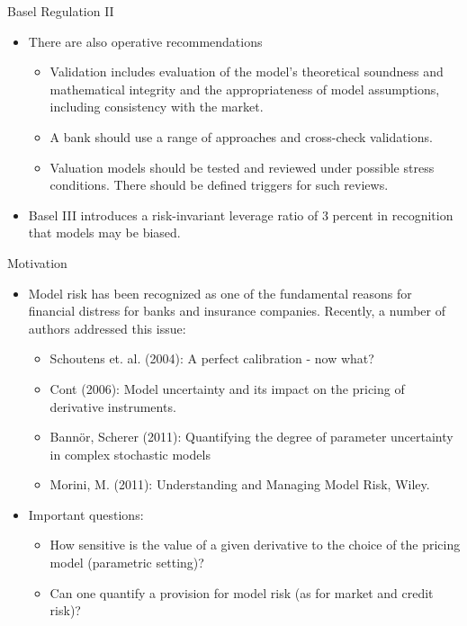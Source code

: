 {Basel Regulation II}
\begin{itemize}

\item<1-> There are also operative recommendations
\begin{itemize}
\item Validation includes evaluation of the model's theoretical soundness and mathematical integrity and the appropriateness of model assumptions, including consistency with the market.
\item A bank should use a range of approaches and cross-check validations.
\item Valuation models should be tested and reviewed under possible stress conditions. There should be defined triggers for such reviews.
\end{itemize}

\item<2->
Basel III introduces a risk-invariant leverage ratio of 3 percent in recognition that models may be biased.


\end{itemize}



{Motivation}
\begin{itemize}
\item<1-> Model risk has been recognized as one of the fundamental reasons for financial distress for banks and insurance companies.
Recently, a number of authors addressed this issue:
\begin{itemize}
\item Schoutens et. al. (2004): A perfect calibration - now what?
\item Cont (2006): Model uncertainty and its impact on the pricing of derivative instruments.
\item Bann{\"o}r, Scherer (2011): Quantifying the degree of parameter uncertainty in complex stochastic models
\item Morini, M. (2011): Understanding and Managing Model Risk, Wiley.
\end{itemize}
\item<2-> Important questions:
\begin{itemize}
\item How sensitive is the value of a given derivative to the choice of the pricing model (parametric setting)?
\item Can one quantify a provision for model risk (as for market and credit risk)?
\end{itemize}

\end{itemize}




